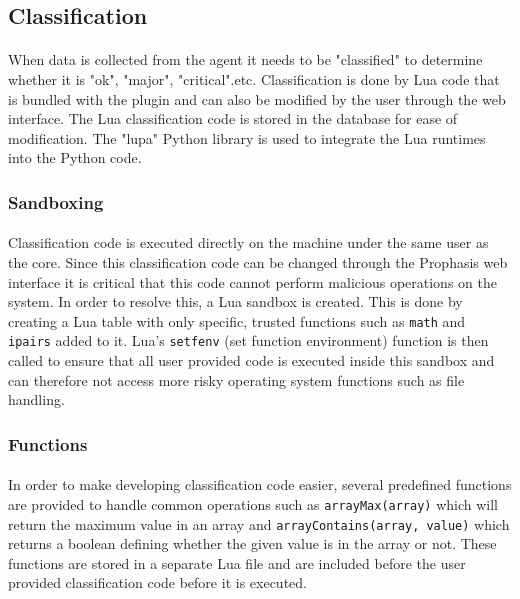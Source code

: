\documentclass[bsc,logo,twoside,singlespacing,notimes]{infthesis}
\begin{document}
\subsection{Classification}
\paragraph*{}
	When data is collected from the agent it needs to be "classified" to determine
	whether it is "ok", "major", "critical".etc.  Classification is done by Lua
	code that is bundled with the plugin and can also be modified by the user
	through the web interface.  The Lua classification code is stored in the
	database for ease of modification.  The "lupa" Python library is used to
	integrate the Lua runtimes into the Python code.

\subsubsection{Sandboxing}
\label{classification_sandboxing}
\paragraph*{}
	Classification code is executed directly on the machine under the same user as
	the core.  Since this classification code can be changed through the Prophasis
	web interface it is critical that this code cannot perform malicious operations
	on the system.  In order to resolve this, a Lua sandbox is created.  This is
	done by creating a Lua table with only specific, trusted functions such as
	\texttt{math} and \texttt{ipairs} added to it.  Lua's \texttt{setfenv} (set
	function environment) function is then called to ensure that all user provided
	code is executed inside this sandbox and can therefore not access more risky
	operating system functions such as file handling.

\subsubsection{Functions}
\paragraph*{}
	In order to make developing classification code easier, several predefined
	functions are provided to handle common operations such as
	\texttt{arrayMax(array)} which will return the maximum value in an array and
	\texttt{arrayContains(array, value)} which returns a boolean defining whether
	the given value is in the array or not.  These functions are stored in a
	separate Lua file and are included before the user provided classification code
	before it is executed.
\end{document}
